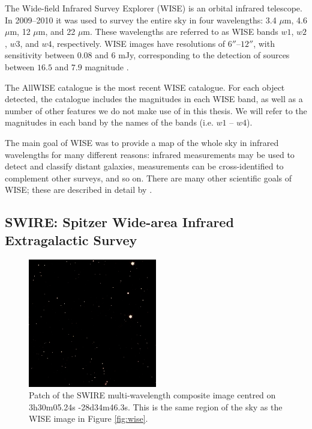             The Wide-field Infrared Survey Explorer (WISE) is an orbital
            infrared telescope. In 2009--2010 it was used to survey the entire
            sky in four wavelengths: 3.4 $\mu$m, 4.6 $\mu$m, 12 $\mu$m, and 22
            $\mu$m. These wavelengths are referred to as WISE bands $w1$, $w2$,
            $w3$, and $w4$, respectively. WISE images have resolutions of
            $6''$--$12''$, with sensitivity between $0.08$ and $6$ mJy,
            corresponding to the detection of sources between $16.5$ and $7.9$
            magnitude \citep{wright10}.

            The AllWISE catalogue \citep{cutri13} is the most recent WISE
            catalogue. For each object detected, the catalogue includes the
            magnitudes in each WISE band, as well as a number of other features
            we do not make use of in this thesis. We will refer to the
            magnitudes in each band by the names of the bands (i.e. $w1$ --
            $w4$).

            The main goal of WISE was to provide a map of the whole sky in
            infrared wavelengths for many different reasons: infrared
            measurements may be used to detect and classify distant galaxies,
            measurements can be cross-identified to complement other surveys,
            and so on. There are many other scientific goals of WISE; these are
            described in detail by \citet{wright10}.

        \subsection{SWIRE: Spitzer Wide-area Infrared Extragalactic Survey}
        \label{sec:swire}

            \begin{figure}[!ht]
                \centering
                \includegraphics[width=0.5\textwidth]{images/swire_small.jpg}
                \caption{Patch of the SWIRE multi-wavelength composite image
                    centred on 3h30m05.24s -28d34m46.3s. This is the same region
                    of the sky as the WISE image in Figure \ref{fig:wise}.}
            \end{figure}

